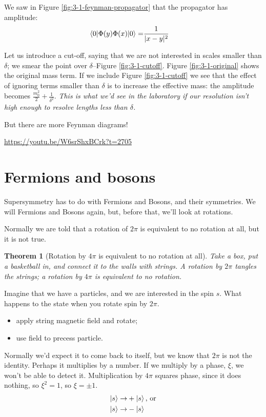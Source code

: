 \documentclass[]{article}
\newtheorem{thm}{Theorem}
\begin{document}
We saw in Figure \ref{fig:3-1-feynman-propagator} that the propagator has amplitude:
\begin{align*}
	\braket{0|\Phi(y)\Phi(x)|0}=&\frac{1}{|x-y|^2}
\end{align*}

Let us introduce a cut-off, saying that we are not interested in scales smaller than $\delta$; we smear the point over $\delta$--Figure \ref{fig:3-1-cutoff}. Figure \ref{fig:3-1-original} shows the original mass term. If we include Figure \ref{fig:3-1-cutoff} we see that the effect of ignoring terms smaller than $\delta$ is to increase the effective mass: the amplitude becomes $\frac{m_0^2}{2}+\frac{1}{\delta^2}$.  \emph{This is what we'd see in the laboratory if our resolution isn't high enough to resolve lengths less than $\delta$.}  

But there are more Feynman diagrams!

\url{https://youtu.be/W6srShxBCrk?t=2705}
	
\section{Fermions and bosons}

Supersymmetry has to do with Fermions and Bosons, and their symmetries. We will Fermions and Bosons again, but, before that, we'll look at rotations.

Normally we are told that a rotation of $2\pi$ is equivalent to no rotation at all, but it is not true.

\begin{thm}[Rotation by $4\pi$ is equivalent to no rotation at all]
	Take a box, put a basketball in, and connect it to the walls with strings. A rotation by $2\pi$ tangles the strings; a rotation by $4\pi$ is equivalent to no rotation.
\end{thm}

Imagine that we have a particles, and we are interested in the spin $s$. What happens to the state when you rotate spin by $2\pi$.
\begin{itemize}
	\item apply string magnetic field and rotate;
	\item use field to precess particle.
\end{itemize}

Normally we'd expect it to come back to itself, but we know that $2\pi$ is not the identity. Perhaps it multiplies by a number. If we multiply by a phase, $\xi$, we won't be able to detect it. Multiplication by $4\pi$ squares phase, since it does nothing, so $\xi^2=1$, so $\xi=\pm1$.
\begin{align*}
	\ket{s} \rightarrow& +\ket{s} \text{, or}\\
	\ket{s} \rightarrow& -\ket{s}
\end{align*}
\end{document}
